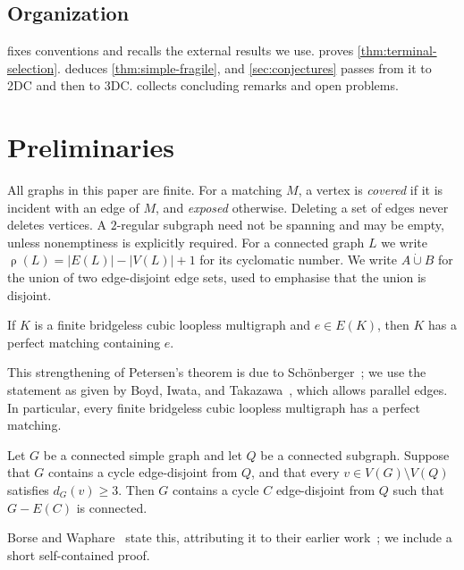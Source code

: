 \documentclass[a4paper,11pt]{article}
\newcommand{\abs}[1]{\left\lvert#1\right\rvert}
\newcommand{\dcup}{\mathbin{\dot\cup}}         %
\DeclareMathOperator{\cyc}{\rho}               %
\numberwithin{equation}{section}
\begin{document}
\subsection*{Organization}

 fixes conventions and recalls the external results we use.
 proves \cref{thm:terminal-selection}.
 deduces \cref{thm:simple-fragile}, and
\cref{sec:conjectures} passes from it to 2DC and then to 3DC.
 collects concluding remarks and open problems.

\section{Preliminaries}\label{sec:prelim}

All graphs in this paper are finite. For a matching $M$, a vertex is
\emph{covered} if it is incident with an edge of $M$, and \emph{exposed}
otherwise. Deleting a set of edges never deletes vertices. A $2$-regular
subgraph need not be spanning and may be empty, unless nonemptiness is
explicitly required. For a connected graph $L$ we write
$\cyc(L)=\abs{E(L)}-\abs{V(L)}+1$ for its cyclomatic number. We write $A\dcup B$ for the
union of two edge-disjoint edge sets, used to emphasise that the union is
disjoint.

\begin{theorem}\label{thm:specified-edge}
  If $K$ is a finite bridgeless cubic loopless multigraph and $e\in E(K)$,
  then $K$ has a perfect matching containing $e$.
\end{theorem}

This strengthening of Petersen's theorem is due to
Sch\"onberger~\cite{Schonberger1935}; we use the statement as given by Boyd, Iwata,
and Takazawa~\cite[Theorem~2.1]{BoydIwataTakazawa2013}, which allows parallel
edges. In particular, every finite bridgeless cubic loopless multigraph has a
perfect matching.

\begin{theorem}\label{thm:protected-cycle}
  Let $G$ be a connected simple graph and let $Q$ be a connected subgraph.
  Suppose that $G$ contains a cycle edge-disjoint from $Q$, and that every
  $v\in V(G)\setminus V(Q)$ satisfies $d_G(v)\ge 3$. Then $G$ contains a cycle
  $C$ edge-disjoint from $Q$ such that $G-E(C)$ is connected.
\end{theorem}

Borse and Waphare~\cite{BorseWaphare2013} state this, attributing it to their
earlier work~\cite{BorseWaphare2009}; we include a short self-contained proof.
\end{document}
